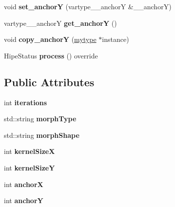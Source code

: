 \begin{DoxyCompactItemize}
void {\bfseries set\+\_\+anchorY} (vartype\+\_\+\+\_\+anchorY \&\+\_\+\+\_\+anchorY)
\item 
\mbox{\label{classfilter_1_1algos_1_1_dilate_afd4ff295f7e801ee88a77dda956b7a26}} 
vartype\+\_\+\+\_\+anchorY {\bfseries get\+\_\+anchorY} ()
\item 
\mbox{\label{classfilter_1_1algos_1_1_dilate_a51a3feb6d21f46877e740ea7deda8380}} 
void {\bfseries copy\+\_\+anchorY} (\hyperlink{classfilter_1_1algos_1_1_dilate}{mytype} $\ast$instance)
\item 
\mbox{\label{classfilter_1_1algos_1_1_dilate_ac35eac6b1fe8a370b2315f9692785533}} 
Hipe\+Status {\bfseries process} () override
\end{DoxyCompactItemize}
\subsection*{Public Attributes}
\begin{DoxyCompactItemize}
\item 
\mbox{\label{classfilter_1_1algos_1_1_dilate_abbaed4fd63964a534c40eb0a27333151}} 
int {\bfseries iterations}
\item 
\mbox{\label{classfilter_1_1algos_1_1_dilate_aaddee9ad24724a9b85b87e3b1f44a355}} 
std\+::string {\bfseries morph\+Type}
\item 
\mbox{\label{classfilter_1_1algos_1_1_dilate_a3fb2833c1503359d0db04e45988cb0a1}} 
std\+::string {\bfseries morph\+Shape}
\item 
\mbox{\label{classfilter_1_1algos_1_1_dilate_a4f13e2e0e1d5fa8d716b4638f70179ed}} 
int {\bfseries kernel\+SizeX}
\item 
\mbox{\label{classfilter_1_1algos_1_1_dilate_abfe9cc6f2fe4d09439912342a6f56830}} 
int {\bfseries kernel\+SizeY}
\item 
\mbox{\label{classfilter_1_1algos_1_1_dilate_a5a867f4905d3d640bb2e3b4fbb28afc7}} 
int {\bfseries anchorX}
\item 
\mbox{\label{classfilter_1_1algos_1_1_dilate_a2f3302d068567324856dfd87ceb41e68}} 
int {\bfseries anchorY}
\end{DoxyCompactItemize}
